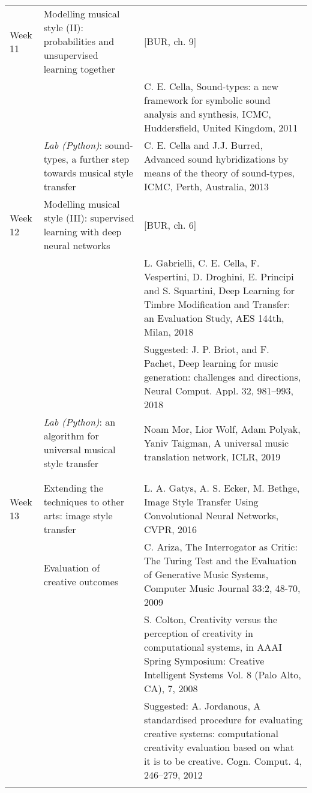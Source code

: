 \documentclass[letterpaper]{inzane_syllabus} %
\begin{document}
\begin{center}
\begin{tabularx}{\textwidth}{p{2cm}p{8cm} @{\hskip 0.5cm} p{9.5cm}}
Week 11 & Modelling musical style (II): probabilities and unsupervised learning together & [BUR, ch. 9] \\

& & C. E. Cella, Sound-types: a new framework for symbolic sound analysis and synthesis, ICMC, Huddersfield, United Kingdom, 2011 \\

&\emph{Lab (Python)}: sound-types, a further step towards musical style transfer & C. E. Cella and J.J. Burred, Advanced sound hybridizations by means of the theory of sound-types, ICMC, Perth, Australia, 2013 \\

\arrayrulecolor{maingray}\hline
Week 12 & Modelling musical style (III): supervised learning with deep neural networks &  [BUR, ch. 6] \\
& &  L. Gabrielli, C. E. Cella, F. Vespertini, D. Droghini, E. Principi and S. Squartini, Deep Learning for Timbre Modification and Transfer: an Evaluation Study, AES 144th, Milan, 2018 \\
& & Suggested: J. P. Briot, and F. Pachet, Deep learning for music generation: challenges and directions, Neural Comput. Appl. 32, 981–993, 2018 \\

&\emph{ Lab (Python)}: an algorithm for universal musical style transfer &   Noam Mor, Lior Wolf, Adam Polyak, Yaniv Taigman, A universal music translation network, ICLR, 2019 \\
& & \\ 

\arrayrulecolor{myCOLOR}\hline
\multicolumn{2}{l}{\textbf{\textcolor{myCOLOR}{\large MODULE 3: Connections}}} \\
\hline
\arrayrulecolor{maingray}\hline

Week 13 & Extending the techniques to other arts: image style transfer & L. A. Gatys, A. S. Ecker, M. Bethge, Image Style Transfer Using Convolutional Neural Networks, CVPR, 2016 \\ 
&Evaluation of creative outcomes & C. Ariza, The Interrogator as Critic: The Turing Test and the Evaluation of Generative Music Systems, Computer Music Journal 33:2, 48-70, 2009  \\
& & S. Colton, Creativity versus the perception of creativity in computational systems, in AAAI Spring Symposium: Creative Intelligent Systems Vol. 8 (Palo Alto, CA), 7, 2008 \\
& & Suggested: A. Jordanous, A standardised procedure for evaluating creative systems:
computational creativity evaluation based on what it is to be creative. Cogn. Comput. 4, 246–279, 2012 \\
\arrayrulecolor{maingray}\hline


\end{tabularx}
\end{center}
\end{document}

